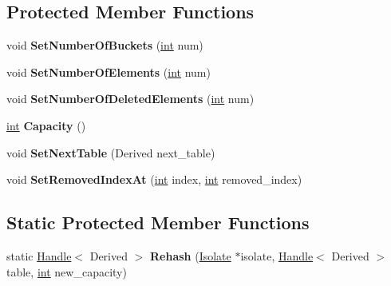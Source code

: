 \subsection*{Protected Member Functions}
\begin{DoxyCompactItemize}
\item 
\mbox{\label{classv8_1_1internal_1_1OrderedHashTable_adeea6ef4bcd7c553acb872dc8c743c5d}} 
void {\bfseries Set\+Number\+Of\+Buckets} (\mbox{\hyperlink{classint}{int}} num)
\item 
\mbox{\label{classv8_1_1internal_1_1OrderedHashTable_a6510de13d72f8440065cc2848159bad4}} 
void {\bfseries Set\+Number\+Of\+Elements} (\mbox{\hyperlink{classint}{int}} num)
\item 
\mbox{\label{classv8_1_1internal_1_1OrderedHashTable_a053da906e1081f8ee2fa0ac0ca23fcb6}} 
void {\bfseries Set\+Number\+Of\+Deleted\+Elements} (\mbox{\hyperlink{classint}{int}} num)
\item 
\mbox{\label{classv8_1_1internal_1_1OrderedHashTable_ab0b65d1dd6872fad36fdbd90100757b0}} 
\mbox{\hyperlink{classint}{int}} {\bfseries Capacity} ()
\item 
\mbox{\label{classv8_1_1internal_1_1OrderedHashTable_abaeae119a86c7938dae5377f8a836790}} 
void {\bfseries Set\+Next\+Table} (Derived next\+\_\+table)
\item 
\mbox{\label{classv8_1_1internal_1_1OrderedHashTable_a7076e90a7c0988e3a8a756432e3b482f}} 
void {\bfseries Set\+Removed\+Index\+At} (\mbox{\hyperlink{classint}{int}} index, \mbox{\hyperlink{classint}{int}} removed\+\_\+index)
\end{DoxyCompactItemize}
\subsection*{Static Protected Member Functions}
\begin{DoxyCompactItemize}
\item 
\mbox{\label{classv8_1_1internal_1_1OrderedHashTable_a705a70a8726281feaca0304a3bc64cfd}} 
static \mbox{\hyperlink{classv8_1_1internal_1_1Handle}{Handle}}$<$ Derived $>$ {\bfseries Rehash} (\mbox{\hyperlink{classv8_1_1internal_1_1Isolate}{Isolate}} $\ast$isolate, \mbox{\hyperlink{classv8_1_1internal_1_1Handle}{Handle}}$<$ Derived $>$ table, \mbox{\hyperlink{classint}{int}} new\+\_\+capacity)
\end{DoxyCompactItemize}
